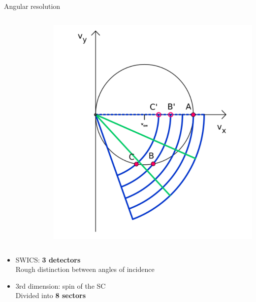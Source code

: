 \documentclass{beamer}
\begin{document}
\begin{frame}{Angular resolution}
\begin{columns}
\begin{figure}
		\end{figure}
		\column{4cm}
		\vspace{1.1cm}
		\includegraphics[scale=0.38]{Pics/swics_col_3.pdf}
	\end{columns}
	\begin{itemize}
	\item SWICS: \textbf{3 detectors} \\ \small{Rough distinction between angles of incidence}
	\item \normalsize{3rd dimension: spin of the SC} \\ \small{Divided into \textbf{8 sectors}}
\end{itemize}
\end{frame}
\end{document}
